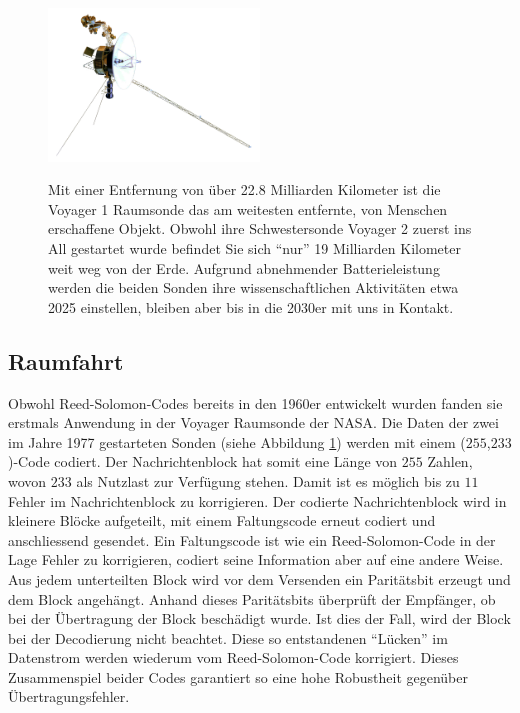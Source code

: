 \begin{figure}
	\centering
	\includegraphics[width=0.5\textwidth]{papers/reedsolomon/images/Voyager_Sonde}
	\caption{Mit einer Entfernung von über 22.8 Milliarden Kilometer ist die Voyager 1 Raumsonde das am weitesten entfernte, von Menschen erschaffene Objekt. Obwohl ihre Schwestersonde Voyager 2 zuerst ins All gestartet wurde befindet Sie sich ``nur'' 19 Milliarden Kilometer weit weg von der Erde. Aufgrund abnehmender Batterieleistung werden die beiden Sonden ihre wissenschaftlichen Aktivitäten etwa 2025 einstellen, bleiben aber bis in die 2030er mit uns in Kontakt.}
%
	\label{fig:voyager}
\end{figure}

\subsection{Raumfahrt}
Obwohl Reed-Solomon-Codes bereits in den 1960er entwickelt wurden fanden sie erstmals Anwendung in der Voyager Raumsonde der NASA. Die Daten der zwei im Jahre 1977 gestarteten Sonden (siehe Abbildung \ref{fig:voyager}) werden mit einem ($255$,$233$)-Code
%
%
codiert. 
Der Nachrichtenblock hat somit eine Länge von $255$ Zahlen, wovon $233$ als Nutzlast zur Verfügung stehen.
Damit ist es möglich bis zu $11$ Fehler im Nachrichtenblock zu korrigieren. 
Der codierte Nachrichtenblock wird in kleinere Blöcke aufgeteilt, mit einem Faltungscode erneut codiert und anschliessend gesendet.
Ein Faltungscode ist wie ein Reed-Solomon-Code in der Lage Fehler zu korrigieren, 
codiert seine Information aber auf eine andere Weise. Aus jedem unterteilten Block wird vor dem Versenden ein Paritätsbit erzeugt und dem Block angehängt. Anhand dieses Paritätsbits überprüft der Empfänger, ob bei der Übertragung der Block beschädigt wurde. Ist dies der Fall, wird der Block bei der Decodierung nicht beachtet. Diese so entstandenen ``Lücken'' im Datenstrom werden wiederum vom Reed-Solomon-Code korrigiert. Dieses Zusammenspiel beider Codes garantiert so eine hohe Robustheit gegenüber Übertragungsfehler. 

